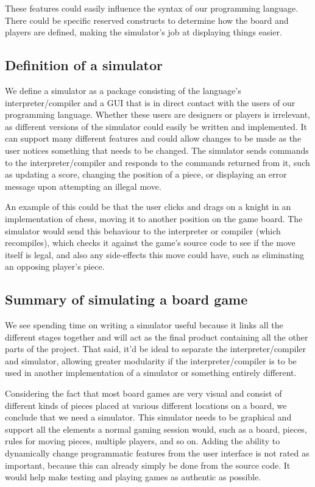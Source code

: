These features could easily influence the syntax of our programming language.
There could be specific reserved constructs to determine how the board and
players are defined, making the simulator's job at displaying things easier.

\subsection{Definition of a simulator}
We define a simulator as a package consisting of the language's
interpreter/compiler and a GUI that is in direct contact with the users of our
programming language. Whether these users are designers or players is
irrelevant, as different versions of the simulator could easily be written and
implemented. It can support many different features and could allow changes to
be made as the user notices something that needs to be changed. The simulator
sends commands to the interpreter/compiler and responds to the commands returned
from it, such as updating a score, changing the position of a piece, or
displaying an error message upon attempting an illegal move.

An example of this could be that the user clicks and drags on a knight in an
implementation of chess, moving it to another position on the game board. The
simulator would send this behaviour to the interpreter or compiler (which
recompiles), which checks it against the game's source code to see if the move
itself is legal, and also any side-effects this move could have, such as
eliminating an opposing player's piece.

\subsection{Summary of simulating a board game}
We see spending time on writing a simulator useful because it links all the
different stages together and will act as the final product containing all the
other parts of the project. That said, it'd be ideal to separate the
interpreter/compiler and simulator, allowing greater modularity if the
interpreter/compiler is to be used in another implementation of a simulator or
something entirely different.

Considering the fact that most board games are very visual and consist of
different kinds of pieces placed at various different locations on a board, we
conclude that we need a simulator. This simulator needs to be graphical and
support all the elements a normal gaming session would, such as a board, pieces,
rules for moving pieces, multiple players, and so on. Adding the ability to
dynamically change programmatic features from the user interface is not rated as
important, because this can already simply be done from the source code. It
would help make testing and playing games as authentic as possible.
